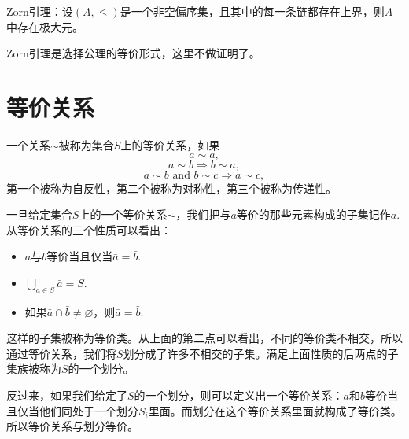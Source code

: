 \theo Zorn引理：设$(A,\leq)$是一个非空偏序集，且其中的每一条链都存在上界，则$A$中存在极大元。

Zorn引理是选择公理的等价形式，这里不做证明了。

\section{等价关系}
\para 一个关系$\sim$被称为集合$S$上的等价关系，如果
\[
	a\sim a,
\]
\[
	a\sim b \Rightarrow b \sim a,
\]
\[
	a\sim b\text{ and } b\sim c \Rightarrow a \sim c,
\]
第一个被称为自反性，第二个被称为对称性，第三个被称为传递性。

\para 一旦给定集合$S$上的一个等价关系$\sim$，我们把与$a$等价的那些元素构成的子集记作$\bar{a}$. 从等价关系的三个性质可以看出：
\begin{itemize}
\item $a$与$b$等价当且仅当$\bar{a}=\bar{b}$. 
\item $\bigcup_{a\in S}\bar{a}=S$.
\item 如果$\bar{a}\cap \bar{b}\neq \varnothing$，则$\bar{a}=\bar{b}$.
\end{itemize}
这样的子集被称为等价类。从上面的第二点可以看出，不同的等价类不相交，所以通过等价关系，我们将$S$划分成了许多不相交的子集。满足上面性质的后两点的子集族被称为$S$的一个划分。

\para 反过来，如果我们给定了$S$的一个划分，则可以定义出一个等价关系：$a$和$b$等价当且仅当他们同处于一个划分$S_i$里面。而划分在这个等价关系里面就构成了等价类。所以等价关系与划分等价。
